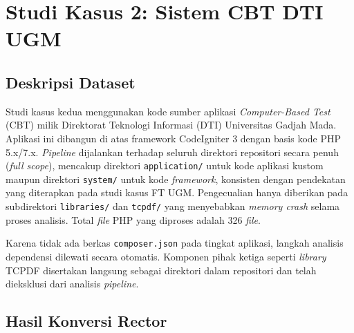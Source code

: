 \section{Studi Kasus 2: Sistem CBT DTI UGM}

\subsection{Deskripsi Dataset}

Studi kasus kedua menggunakan kode sumber aplikasi 
\textit{Computer-Based Test} (CBT) milik Direktorat Teknologi 
Informasi (DTI) Universitas Gadjah Mada. Aplikasi ini dibangun di atas framework CodeIgniter 3 
dengan basis kode PHP 5.x/7.x. \textit{Pipeline} dijalankan terhadap 
seluruh direktori repositori secara penuh (\textit{full scope}), 
mencakup direktori \texttt{application/} untuk kode aplikasi 
kustom maupun direktori \texttt{system/} untuk kode 
\textit{framework}, konsisten dengan pendekatan yang diterapkan 
pada studi kasus FT UGM. Pengecualian hanya diberikan pada 
subdirektori \texttt{libraries/} dan \texttt{tcpdf/} yang 
menyebabkan \textit{memory crash} selama proses analisis. 
Total \textit{file} PHP yang diproses adalah 326 \textit{file}.

Karena tidak ada berkas \texttt{composer.json} pada tingkat 
aplikasi, langkah analisis dependensi dilewati secara otomatis. 
Komponen pihak ketiga seperti \textit{library} TCPDF disertakan 
langsung sebagai direktori dalam repositori dan telah dieksklusi 
dari analisis \textit{pipeline}.

\subsection{Hasil Konversi Rector}

